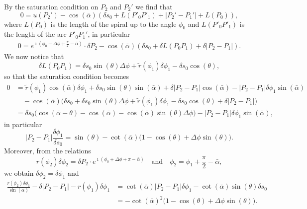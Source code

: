 \documentclass[reqno]{amsart}
\theoremstyle{definition} \newtheorem{definition}{Definition}[section]
\theoremstyle{definition} \newtheorem{remark}[definition]{Remark}
\theoremstyle{plain} \newtheorem{lemma}[definition]{Lemma}
\theoremstyle{plain} \newtheorem{proposition}[definition]{Proposition}
\theoremstyle{plain} \newtheorem{theorem}[definition]{Theorem}
\theoremstyle{plain} \newtheorem{corollary}[definition]{Corollary}
\theoremstyle{definition} \newtheorem{example}[definition]{Example}
\theoremstyle{plain} \newtheorem{claim}[clai]{Claim}
\theoremstyle{definition} \newtheorem{assumption}[definition]{Assumption}
\theoremstyle{definition} \newtheorem{observation}[definition]{Observation}
\newcommand{\1}{\mathbbm 1}
\renewcommand{\i}{\imath}
\numberwithin{equation}{section} %
\theoremstyle{plain} \newtheorem*{theorem*}{Theorem}
\theoremstyle{plain} \newtheorem{mthm}[maintheorem]{Main Theorem}
\theoremstyle{plain} \newtheorem*{mthm*}{Main Theorem}
\theoremstyle{plain} \newtheorem*{conjecture*}{Conjecture}
\theoremstyle{plain} \newtheorem{conjecture}[definition]{Conjecture}
\theoremstyle{plain} \newtheorem*{problem*}{Problem}
\begin{document}
By the saturation condition on $P_2$ and $P_2'$ we find that
\begin{equation*}
0 = u(P_2') - \cos(\bar \alpha) (\delta s_0 +L(P'_0P'_1) +|P_2' - P_1'|+L(P_0)),
\end{equation*}
where $L(P_0)$ is the length of the spiral up to the angle $\phi_0$ and $L(P'_0P'_1)$ is the length of the arc $P'_0P_1'$, in particular
\begin{align*}
0 = e^{\i (\phi_0 + \Delta\phi+\frac{\pi}{2} - \bar \alpha)} \cdot \delta P_2 - \cos(\bar \alpha) (\delta s_0 + \delta L(P_0P_1)+ \delta |P_2 - P_1|).
\end{align*}
We now notice that
\begin{equation*}
\delta L(P_0P_1) = \delta s_0 \sin(\theta) \Delta \phi + \tilde r(\phi_1) \delta \phi_1 - \delta s_0 \cos(\theta),
\end{equation*}
so that the saturation condition becomes 
\begin{align*}
0 &= \tilde r(\phi_1) \cos(\bar \alpha) \delta \phi_1 + \delta s_0 \sin(\theta) \sin(\bar \alpha) + \delta |P_2 - P_1| \cos(\bar \alpha) - |P_2 - P_1| \delta \phi_1 \sin(\bar \alpha) \\
& \quad - \cos(\bar \alpha) \big( \delta s_0 + \delta s_0 \sin(\theta) \Delta \phi + \tilde r(\phi_1) \delta \phi_1 - \delta s_0 \cos(\theta) + \delta |P_2 - P_1| \big) \\
&= \delta s_0 \big( \cos(\bar \alpha - \theta) - \cos(\bar \alpha) - \cos(\bar \alpha) \sin(\theta) \Delta\phi \big) - |P_2 - P_1| \delta \phi_1 \sin(\bar \alpha),
\end{align*}
in particular
\begin{equation}
\label{Equa:DeltaP_arc}
|P_2 - P_1| \frac{\delta \phi_1}{\delta s_0} = \sin(\theta) - \cot(\bar \alpha) \big( 1 - \cos(\theta) + \Delta \phi \sin(\theta) \big).
\end{equation}
Moreover, from the relations
\begin{equation*}
r(\phi_2) \delta \phi_2 = \delta P_2 \cdot e^{\i (\phi_0 + \Delta \phi + \pi - \bar \alpha)} \quad \text{and} \quad \phi_2 = \phi_1 + \frac{\pi}{2} - \bar \alpha,
\end{equation*}
we obtain $\delta \phi_2 = \delta \phi_1$ and
\begin{equation}
\label{Equa:Deltar_arc}
\begin{split}
\frac{r(\phi_2) \delta \phi_1}{\sin(\bar \alpha)} - \delta |P_2 - P_1| - r(\phi_1) \delta \phi_1 &= \cot(\bar \alpha) |P_2 - P_1| \delta \phi_1 - \cot(\bar \alpha) \sin(\theta) \delta s_0 \\
&= - \cot(\bar \alpha)^2 \big( 1 - \cos(\theta) + \Delta \phi \sin(\theta) \big).
\end{split}
\end{equation}
\end{document}
